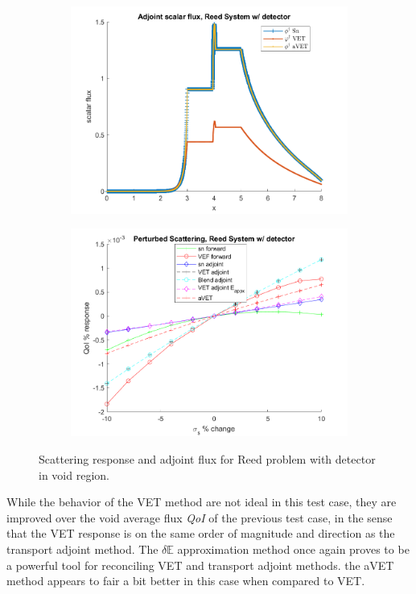 \documentclass[12pt]{report}
\newcommand{\Edd}{\mathbb{E}}
\newcommand{\qoi}{{\it QoI}\xspace}
\begin{document}
\begin{figure}[H]
\centering
\begin{subfigure}{.5\textwidth}
  \centering
  \includegraphics[width=.98\linewidth]{figures2/775phia.png}
\end{subfigure}%
\begin{subfigure}{.5\textwidth}
  \centering
  \includegraphics[width=.98\linewidth]{figures2/775sigsSens.png}
\end{subfigure}
\caption{Scattering response and adjoint flux for Reed problem with detector in void region.}
\label{Reed5}
\end{figure}
While the behavior of the VET method are not ideal in this test case, they are improved over the void average flux \qoi of the previous test case, in the sense that the VET response is on the same order of magnitude and direction as the transport adjoint method. The $\delta \Edd$ approximation method once again proves to be a powerful tool for reconciling VET and transport adjoint methods. the aVET method appears to fair a bit better in this case when compared to VET.
\end{document}
